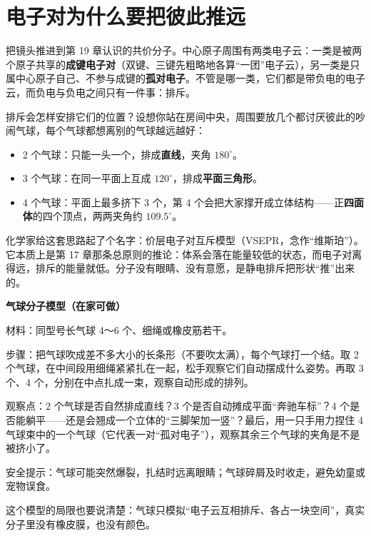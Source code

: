 \section{电子对为什么要把彼此推远}

把镜头推进到第 19 章认识的共价分子。中心原子周围有两类电子云：一类是被两个原子共享的\textbf{成键电子对}（双键、三键先粗略地各算“一团”电子云），另一类是只属中心原子自己、不参与成键的\textbf{孤对电子}。不管是哪一类，它们都是带负电的电子云，而负电与负电之间只有一件事：排斥。

排斥会怎样安排它们的位置？设想你站在房间中央，周围要放几个都讨厌彼此的吵闹气球，每个气球都想离别的气球越远越好：

\begin{itemize}[itemsep=2pt]
\item 2 个气球：只能一头一个，排成\textbf{直线}，夹角 $180^{\circ}$。
\item 3 个气球：在同一平面上互成 $120^{\circ}$，排成\textbf{平面三角形}。
\item 4 个气球：平面上最多挤下 3 个，第 4 个会把大家撑开成立体结构——正\textbf{四面体}的四个顶点，两两夹角约 $109.5^{\circ}$。
\end{itemize}

化学家给这套思路起了个名字：价层电子对互斥模型（VSEPR，念作“维斯珀”）。它本质上是第 17 章那条总原则的推论：体系会落在能量较低的状态，而电子对离得远，排斥的能量就低。分子没有眼睛、没有意愿，是静电排斥把形状“推”出来的。

\begin{shiyan}
\textbf{气球分子模型（在家可做）}

材料：同型号长气球 4～6 个、细绳或橡皮筋若干。

步骤：把气球吹成差不多大小的长条形（不要吹太满），每个气球打一个结。取 2 个气球，在中间段用细绳紧紧扎在一起，松手观察它们自动摆成什么姿势。再取 3 个、4 个，分别在中点扎成一束，观察自动形成的排列。

观察点：2 个气球是否自然排成直线？3 个是否自动摊成平面“奔驰车标”？4 个是否能躺平——还是会翘成一个立体的“三脚架加一竖”？最后，用一只手用力捏住 4 气球束中的一个气球（它代表一对“孤对电子”），观察其余三个气球的夹角是不是被挤小了。

安全提示：气球可能突然爆裂，扎结时远离眼睛；气球碎屑及时收走，避免幼童或宠物误食。

这个模型的局限也要说清楚：气球只模拟“电子云互相排斥、各占一块空间”，真实分子里没有橡皮膜，也没有颜色。
\end{shiyan}

